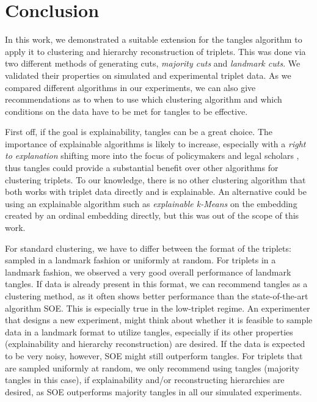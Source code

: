 \chapter{Conclusion}\label{conclusion}
In this work, we demonstrated a suitable extension for the tangles algorithm to apply it to clustering and hierarchy reconstruction of triplets. This was done via
two different methods of generating cuts, \textit{majority cuts} and \textit{landmark cuts}.
We validated their properties on simulated and experimental triplet data.  
As we compared different algorithms in our experiments, we can also give recommendations as to when to use which clustering algorithm and which conditions on the data
have to be met for tangles to be effective. 

First off, if the goal is explainability, tangles can be a great choice. 
The importance of explainable algorithms is likely to increase, especially with 
a \textit{right to explanation} shifting more into the focus of policymakers and legal
scholars \citep{selbstMeaningfulInformationRight2017}, thus tangles could provide a substantial benefit over other algorithms for clustering triplets.
To our knowledge, there is no other clustering algorithm that both works with triplet data directly and is explainable. 
An alternative could be using an explainable algorithm such as \textit{explainable k-Means} \citep{moshkovitzExplainableKMeansKMedians2020} on the embedding created 
by an ordinal embedding directly, but this was out of the scope of this work. 

For standard clustering, we have to differ between the format of the triplets: sampled in a landmark fashion or uniformly at random.
For triplets in a landmark fashion, we observed a very good overall performance of landmark tangles.
If data is already present in this format, we can recommend
tangles as a clustering method, as it often shows better performance than the state-of-the-art algorithm SOE. This is especially true in the low-triplet regime. 
An experimenter that designs a new experiment, might think about whether it is feasible to sample data in a landmark format to utilize tangles, 
especially if its other properties (explainability and hierarchy reconstruction) are desired. 
If the data is expected to be very noisy, however, SOE might still outperform tangles.  
For triplets that are sampled uniformly at random, we only recommend using tangles (majority tangles in this case), if explainability and/or reconstructing hierarchies are desired, as SOE 
outperforms majority tangles in all our simulated experiments.

